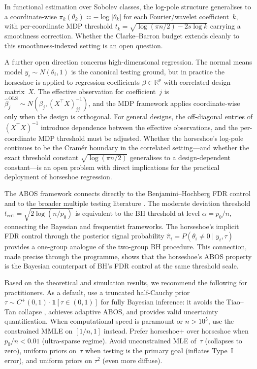 \documentclass[12pt]{article}
\newcommand{\R}{\mathbb{R}}
\newcommand{\abs}[1]{\lvert #1 \rvert}
\newcommand{\tcrit}{t_{\mathrm{crit}}}
\begin{document}
In functional estimation over Sobolev classes, the log-pole structure generalises to a coordinate-wise $\pi_k(\theta_k) \asymp -\log\abs{\theta_k}$ for each Fourier/wavelet coefficient~$k$, with per-coordinate MDP threshold $t_k = \sqrt{\log(\pi n/2) - 2s\log k}$ carrying a smoothness correction. Whether the Clarke--Barron budget extends cleanly to this smoothness-indexed setting is an open question.

A further open direction concerns high-dimensional regression. The normal means model $y_i \sim N(\theta_i, 1)$ is the canonical testing ground, but in practice the horseshoe is applied to regression coefficients $\beta \in \R^p$ with correlated design matrix~$X$. The effective observation for coefficient~$j$ is $\hat{\beta}_j^{\mathrm{OLS}} \sim N(\beta_j, (X^\top X)^{-1}_{jj})$, and the MDP framework applies coordinate-wise only when the design is orthogonal. For general designs, the off-diagonal entries of $(X^\top X)^{-1}$ introduce dependence between the effective observations, and the per-coordinate MDP threshold must be adjusted. Whether the horseshoe's log-pole continues to be the Cram\'er boundary in the correlated setting---and whether the exact threshold constant $\sqrt{\log(\pi n/2)}$ generalises to a design-dependent constant---is an open problem with direct implications for the practical deployment of horseshoe regression.

The ABOS framework connects directly to the Benjamini--Hochberg FDR control and to the broader multiple testing literature \citep{efron2004large,johnstone2004needles}. The moderate deviation threshold $\tcrit = \sqrt{2\log(n/p_0)}$ is equivalent to the BH threshold at level $\alpha = p_0/n$, connecting the Bayesian and frequentist frameworks. The horseshoe's implicit FDR control through the posterior signal probability $\hat{\pi}_i = P(\theta_i \neq 0 \mid y_i, \tau)$ provides a one-group analogue of the two-group BH procedure. This connection, made precise through the \citet{rubin1965bayes} programme, shows that the horseshoe's ABOS property is the Bayesian counterpart of BH's FDR control at the same threshold scale.

Based on the theoretical and simulation results, we recommend the following for practitioners. As a default, use a truncated half-Cauchy prior $\tau \sim C^+(0,1) \cdot \mathbf{1}[\tau \in (0,1)]$ for fully Bayesian inference: it avoids the Tiao--Tan collapse \citep{tiao1965bayesian}, achieves adaptive ABOS, and provides valid uncertainty quantification. When computational speed is paramount or $n > 10^5$, use the constrained MMLE on $[1/n, 1]$ instead. Prefer horseshoe+ over horseshoe when $p_0/n < 0.01$ (ultra-sparse regime). Avoid unconstrained MLE of~$\tau$ (collapses to zero), uniform priors on~$\tau$ when testing is the primary goal (inflates Type~I error), and uniform priors on $\tau^2$ (even more diffuse).
\end{document}
